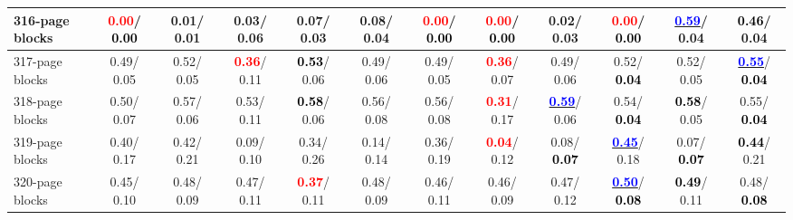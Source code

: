 \begin{table}[h]
\begin{center}
{\begin{tabular}{lc|c|c|c|c|c|c|c|c|c|c}
316-page blocks & \textcolor{red}{\textbf{  0.00}}/\textcolor{black}{\textbf{  0.00}} &   0.01/  0.01 &   0.03/  0.06 &   0.07/  0.03 &   0.08/  0.04 & \textcolor{red}{\textbf{  0.00}}/\textcolor{black}{\textbf{  0.00}} & \textcolor{red}{\textbf{  0.00}}/\textcolor{black}{\textbf{  0.00}} &   0.02/  0.03 & \textcolor{red}{\textbf{  0.00}}/\textcolor{black}{\textbf{  0.00}} & \underline{\textcolor{blue}{\textbf{  0.59}}}/  0.04 & \textcolor{black}{\textbf{  0.46}}/  0.04 \\ \hline
317-page blocks &   0.49/  0.05 &   0.52/  0.05 & \textcolor{red}{\textbf{  0.36}}/  0.11 & \textcolor{black}{\textbf{  0.53}}/  0.06 &   0.49/  0.06 &   0.49/  0.05 & \textcolor{red}{\textbf{  0.36}}/  0.07 &   0.49/  0.06 &   0.52/\textcolor{black}{\textbf{  0.04}} &   0.52/  0.05 & \underline{\textcolor{blue}{\textbf{  0.55}}}/\textcolor{black}{\textbf{  0.04}} \\
318-page blocks &   0.50/  0.07 &   0.57/  0.06 &   0.53/  0.11 & \textcolor{black}{\textbf{  0.58}}/  0.06 &   0.56/  0.08 &   0.56/  0.08 & \textcolor{red}{\textbf{  0.31}}/  0.17 & \underline{\textcolor{blue}{\textbf{  0.59}}}/  0.06 &   0.54/\textcolor{black}{\textbf{  0.04}} & \textcolor{black}{\textbf{  0.58}}/  0.05 &   0.55/\textcolor{black}{\textbf{  0.04}} \\
319-page blocks &   0.40/  0.17 &   0.42/  0.21 &   0.09/  0.10 &   0.34/  0.26 &   0.14/  0.14 &   0.36/  0.19 & \textcolor{red}{\textbf{  0.04}}/  0.12 &   0.08/\textcolor{black}{\textbf{  0.07}} & \underline{\textcolor{blue}{\textbf{  0.45}}}/  0.18 &   0.07/\textcolor{black}{\textbf{  0.07}} & \textcolor{black}{\textbf{  0.44}}/  0.21 \\
320-page blocks &   0.45/  0.10 &   0.48/  0.09 &   0.47/  0.11 & \textcolor{red}{\textbf{  0.37}}/  0.11 &   0.48/  0.09 &   0.46/  0.11 &   0.46/  0.09 &   0.47/  0.12 & \underline{\textcolor{blue}{\textbf{  0.50}}}/\textcolor{black}{\textbf{  0.08}} & \textcolor{black}{\textbf{  0.49}}/  0.11 &   0.48/\textcolor{black}{\textbf{  0.08}} \\\end{tabular}}\label{stratsALCKappa9AllReduxa}
\end{center}
\end{table}
